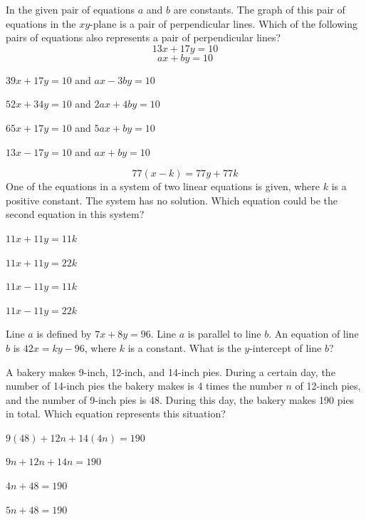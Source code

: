 \vfill
\clearpage
\noindent\begin{minipage}{\linewidth}
\par\smallskip
In the given pair of equations $a$ and $b$ are constants. The graph of this pair of equations in the $xy$-plane is a pair of perpendicular lines. Which of the following pairs of equations also represents a pair of perpendicular lines? $$13x+17y=10$$ $$ax+by=10$$
\begin{satchoices}
  \item[A)] $39x+17y=10$ \quad and \quad $ax-3by=10$
  \item[B)] $52x+34y=10$ \quad and \quad $2ax+4by=10$
  \item[C)] $65x+17y=10$ \quad and \quad $5ax+by=10$
  \item[D)] $13x-17y=10$ \quad and \quad $ax+by=10$
\end{satchoices}
\end{minipage}
\vfill
\noindent\begin{minipage}{\linewidth}
\par\smallskip
$$77(x-k)=77y+77k$$ One of the equations in a system of two linear equations is given, where $k$ is a positive constant. The system has no solution. Which equation could be the second equation in this system?
\begin{satchoices}
  \item[A)] $11x+11y=11k$
  \item[B)] $11x+11y=22k$
  \item[C)] $11x-11y=11k$
  \item[D)] $11x-11y=22k$
\end{satchoices}
\end{minipage}
\vfill
\noindent\begin{minipage}{\linewidth}
\par\smallskip
Line $a$ is defined by $7x+8y=96$. Line $a$ is parallel to line $b$. An equation of line $b$ is $42x=ky-96$, where $k$ is a constant. What is the $y$-intercept of line $b$?
\end{minipage}
\vfill
\clearpage
\noindent\begin{minipage}{\linewidth}
\par\smallskip
A bakery makes 9-inch, 12-inch, and 14-inch pies. During a certain day, the number of 14-inch pies the bakery makes is 4 times the number $n$ of 12-inch pies, and the number of 9-inch pies is 48. During this day, the bakery makes 190 pies in total. Which equation represents this situation?
\begin{satchoices}
  \item[A)] $9(48)+12n+14(4n)=190$
  \item[B)] $9n+12n+14n=190$
  \item[C)] $4n+48=190$
  \item[D)] $5n+48=190$
\end{satchoices}
\end{minipage}
